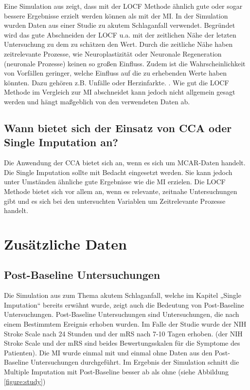 Eine Simulation aus \textcite[]{Young-Saver2018} zeigt, dass mit der LOCF Methode ähnlich gute oder sogar bessere 
Ergebnisse erzielt werden können als mit der MI. In der Simulation wurden Daten aus einer Studie zu akutem Schlaganfall 
verwendet. Begründet wird das gute Abschneiden der LOCF u.a. mit der zeitlichen Nähe der letzten Untersuchung zu dem zu 
schätzen den Wert. Durch die zeitliche Nähe haben zeitrelevante Prozesse, wie Neuroplastizität oder Neuronale Regeneration 
(neuronale Prozesse) keinen so großen Einfluss. Zudem ist die Wahrscheinlichkeit von Vorfällen geringer, welche Einfluss 
auf die zu erhebenden Werte haben könnten. Dazu gehören z.B. Unfälle oder Herzinfarkte. \autocite[3667]{Young-Saver2018}. 
Wie gut die LOCF Methode im Vergleich zur MI abschneidet kann jedoch nicht allgemein gesagt werden und hängt maßgeblich 
von den verwendeten Daten ab. 


\subsection{Wann bietet sich der Einsatz von CCA oder Single Imputation an?}

Die Anwendung der CCA bietet sich an, wenn es sich um MCAR-Daten handelt. 
Die Single Imputation sollte mit Bedacht eingesetzt werden. Sie kann jedoch unter Umständen ähnliche gute Ergebnisse 
wie die MI erzielen. Die LOCF Methode bietet sich vor allem an, wenn es relevante, zeitnahe Untersuchungen gibt und es 
sich bei den untersuchten Variablen um Zeitrelevante Prozesse handelt. 


\section{Zusätzliche Daten}
\label{section:additional_data}

\subsection{Post-Baseline Untersuchungen}

Die Simulation aus \textcite[]{Young-Saver2018} zum Thema akutem Schlaganfall, welche im Kapitel „Single Imputation“ 
bereits erwähnt wurde, zeigt auch die Bedeutung von Post-Baseline Untersuchungen. Post-Baseline Untersuchungen sind
 Untersuchungen, die nach einem Bestimmtem Ereignis erhoben wurden. Im Falle der Studie wurde der NIH Stroke Scale 
 nach 24 Stunden und der mRS nach 7-10 Tagen erhoben. (der NIH Stroke Scale und der mRS sind beides Bewertungsskalen
  für die Symptome des Patienten). Die MI wurde einmal mit und einmal ohne Daten aus den Post-Baseline Untersuchungen 
  durchgeführt. Im Ergebnis der Simulation schnitt die Multiple Imputation mit Post-Baseline besser ab als ohne (siehe Abbildung \ref{figure:study})

